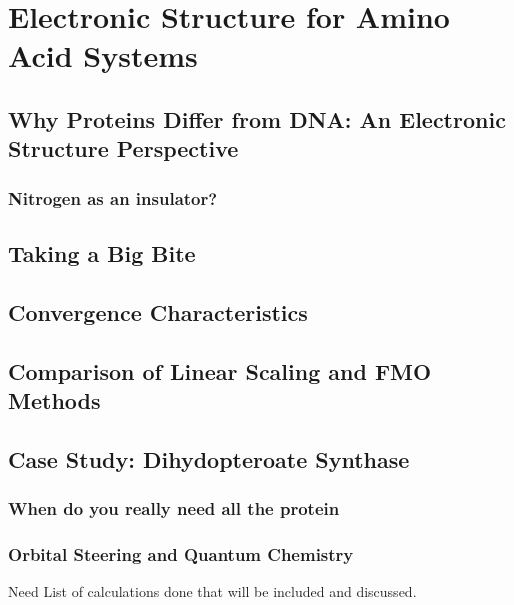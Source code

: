 \chapter{Electronic Structure for Amino Acid Systems}


\section{Why Proteins Differ from DNA: An Electronic Structure Perspective}
\subsection{Nitrogen as an insulator?}

\section{Taking a Big Bite}

\section{Convergence Characteristics}

\section{Comparison of Linear Scaling and FMO Methods}

\section{Case Study: Dihydopteroate Synthase}
\subsection{When do you really need all the protein}
\subsection{Orbital Steering and Quantum Chemistry}

Need List of calculations done that will be included and discussed.

